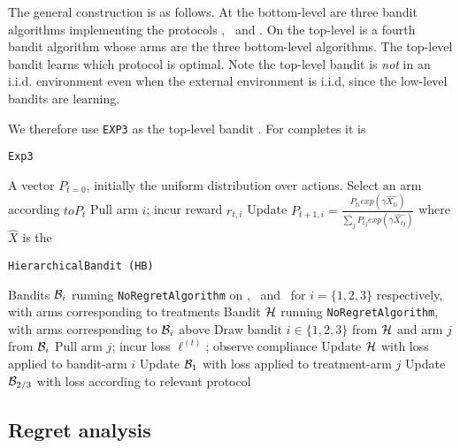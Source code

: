 The general construction is as follows. At the bottom-level are three bandit algorithms implementing the protocols \chosen, \actual\, and \comply. On the top-level is a fourth bandit algorithm whose arms are the three bottom-level algorithms. The top-level bandit learns which protocol is optimal. 
Note the top-level bandit is \emph{not} in an i.i.d. environment even when the external environment is i.i.d, since the low-level bandits are learning.

 We therefore use \texttt{EXP3} as the top-level bandit \cite{auer:02b}. For completes it is
 
 
 
 
\begin{algorithm}
   \caption{\texttt{Exp3}}
   \label{alg:exp3}
   \begin{algorithmic}   
   	A vector $P_{t=0}$, initially the uniform distribution over actions.
	\STATE Select an arm according $to P_{t}$
	\STATE Pull arm $i$; incur reward $r_{t,i}$
	\STATE Update $P_{t+1,i} = \frac{  P_{ti}  exp(\gamma \hat{X_{ti}}) }{  \sum_j P_{tj}  exp(\gamma \hat{X_{tj}}) }  $  where $\hat{X}$ is the 
    \ENDFOR
       	\end{algorithmic}
\end{algorithm}          
 
 
\begin{algorithm}
   \caption{\texttt{HierarchicalBandit (HB)}}
   \label{alg:hier-exp}
   \begin{algorithmic}   
   	 Bandits ${\mathcal B}_i$ running \texttt{NoRegretAlgorithm} on \chosen, \actual\, and \comply\, for $i =\{1,2,3\}$ respectively, with arms corresponding to treatments
   	 Bandit ${\mathcal H}$ running \texttt{NoRegretAlgorithm}, with arms corresponding to ${\mathcal B}_i$ above
	\STATE Draw bandit $i\in\{1,2,3\}$ from ${\mathcal H}$ and arm $j$ from ${\mathcal B}_i$
	\STATE Pull arm $j$; incur loss $\ell^{(t)}$; observe compliance
	\STATE Update ${\mathcal H}$ with loss applied to bandit-arm $i$
	\STATE Update ${\mathcal B}_1$ with loss applied to treatment-arm $j$
	\ENDIF
	\STATE Update ${\mathcal B}_{2/3}$ with loss according to relevant protocol
   	\ENDFOR

       	\end{algorithmic}
\end{algorithm}          

\subsection{Regret analysis}

